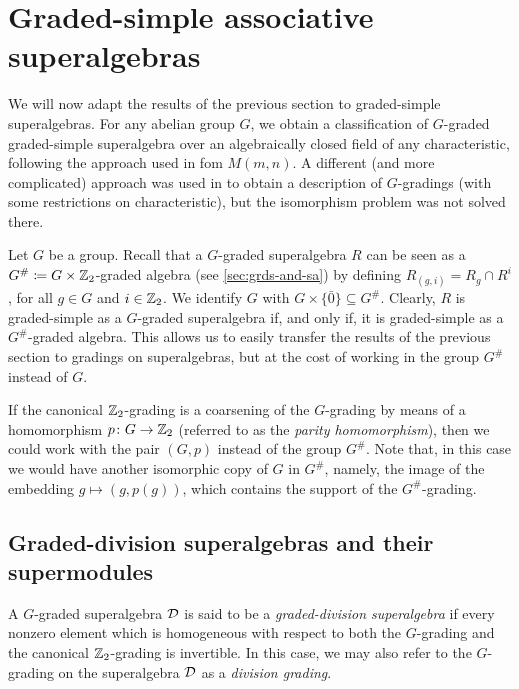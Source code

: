 \section{Graded-simple associative superalgebras}\label{sec:grd-simple-salg}

We will now adapt the results of the previous section to graded-simple superalgebras. 
For any abelian group $G$, we obtain a classification of $G$-graded graded-simple superalgebra over an algebraically closed field of any characteristic, following the approach used in \cite{paper-MAP} fom $M(m,n)$. 
A different (and more complicated) approach was used in \cite{BS} to obtain a description of $G$-gradings (with some restrictions on characteristic), but the isomorphism problem was not solved there. 

Let $G$ be a group. 
Recall that a $G$-graded superalgebra $R$ can be seen as a $G^\# \coloneqq G\times \mathbb{Z}_2$-graded algebra (see \cref{sec:grds-and-sa}) by defining $R_{(g,i)} = R_g \cap R^i$, for all $g\in G$ and $i \in \mathbb{Z}_2$. 
We identify $G$ with $G \times \{ \bar 0 \} \subseteq G^\#$. 
Clearly, $R$ is graded-simple as a $G$-graded superalgebra if, and only if, it is graded-simple as a $G^\#$-graded algebra. 
This allows us to easily transfer the results of the previous section to gradings on superalgebras, but at the cost of working in the group $G^\#$ instead of $G$. 

\begin{remark}
	If the canonical $\mathbb{Z}_2$-grading is a coarsening of the $G$-grading by means of a homomorphism $p\colon G\rightarrow \mathbb{Z}_2$ (referred to as the \emph{parity homomorphism}), then we could work with the pair $(G, p)$ instead of the group $G^\#$. 
	Note that, in this case we would have another isomorphic copy of $G$ in $G^\#$, namely, the image of the embedding $g\mapsto (g, p (g))$, which contains the support of the $G^\#$-grading. 
\end{remark}

\subsection{Graded-division superalgebras and their supermodules}\label{ssec:supermodules-over-D}

\begin{defi}\label{def:grd-div-sa}
    A $G$-graded superalgebra $\mathcal{D}$ is said to be a \emph{graded-division superalgebra} if every nonzero element which is homogeneous with respect to both the $G$-grading and the canonical $\mathbb{Z}_2$-grading is invertible. 
    In this case, we may also refer to the $G$-grading on the superalgebra $\mathcal{D}$ as a \emph{division grading}.
\end{defi}

